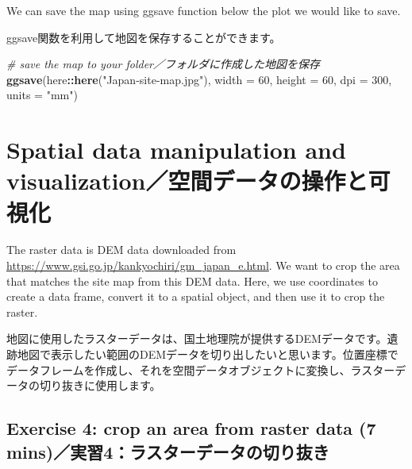 \documentclass[
  xelatex,ja=standard]{bxjsarticle}
\newenvironment{Shaded}{\begin{snugshade}}{\end{snugshade}}
\newcommand{\CommentTok}[1]{\textcolor[rgb]{0.56,0.35,0.01}{\textit{#1}}}
\newcommand{\DataTypeTok}[1]{\textcolor[rgb]{0.13,0.29,0.53}{#1}}
\newcommand{\DecValTok}[1]{\textcolor[rgb]{0.00,0.00,0.81}{#1}}
\newcommand{\KeywordTok}[1]{\textcolor[rgb]{0.13,0.29,0.53}{\textbf{#1}}}
\newcommand{\NormalTok}[1]{#1}
\newcommand{\OperatorTok}[1]{\textcolor[rgb]{0.81,0.36,0.00}{\textbf{#1}}}
\newcommand{\StringTok}[1]{\textcolor[rgb]{0.31,0.60,0.02}{#1}}
\begin{document}
We can save the map using ggsave function below the plot we would like
to save.

ggsave関数を利用して地図を保存することができます。

\begin{Shaded}
\begin{Highlighting}[]
\CommentTok{# save the map to your folder／フォルダに作成した地図を保存 }
\KeywordTok{ggsave}\NormalTok{(here}\OperatorTok{::}\KeywordTok{here}\NormalTok{(}\StringTok{"Japan-site-map.jpg"}\NormalTok{),}
       \DataTypeTok{width =} \DecValTok{60}\NormalTok{,}
       \DataTypeTok{height =} \DecValTok{60}\NormalTok{,}
       \DataTypeTok{dpi =} \DecValTok{300}\NormalTok{,}
       \DataTypeTok{units =} \StringTok{"mm"}\NormalTok{)}
\end{Highlighting}
\end{Shaded}

\hypertarget{spatial-data-manipulation-and-visualizationux7a7aux9593ux30c7ux30fcux30bfux306eux64cdux4f5cux3068ux53efux8996ux5316}{%
\section{Spatial data manipulation and
visualization／空間データの操作と可視化}\label{spatial-data-manipulation-and-visualizationux7a7aux9593ux30c7ux30fcux30bfux306eux64cdux4f5cux3068ux53efux8996ux5316}}

The raster data is DEM data downloaded from
\url{https://www.gsi.go.jp/kankyochiri/gm_japan_e.html}. We want to crop
the area that matches the site map from this DEM data. Here, we use
coordinates to create a data frame, convert it to a spatial object, and
then use it to crop the raster.

地図に使用したラスターデータは、国土地理院が提供するDEMデータです。遺跡地図で表示したい範囲のDEMデータを切り出したいと思います。位置座標でデータフレームを作成し、それを空間データオブジェクトに変換し、ラスターデータの切り抜きに使用します。

\hypertarget{exercise-4-crop-an-area-from-raster-data-7-minsux5b9fux7fd24ux30e9ux30b9ux30bfux30fcux30c7ux30fcux30bfux306eux5207ux308aux629cux304d}{%
\subsection{Exercise 4: crop an area from raster data (7
mins)／実習4：ラスターデータの切り抜き}\label{exercise-4-crop-an-area-from-raster-data-7-minsux5b9fux7fd24ux30e9ux30b9ux30bfux30fcux30c7ux30fcux30bfux306eux5207ux308aux629cux304d}}
\end{document}
